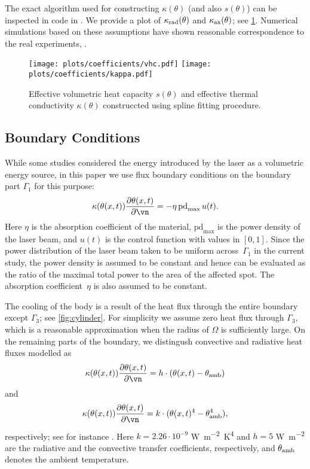 The exact algorithm used for constructing $\kappa(\theta)$ (and also $s(\theta)$) can be inspected in code in \cite[\texttt{optipuls.coefficients}]{optipuls_github}. 
We provide a plot of $\kappa_\textup{rad}(\theta)$ and $\kappa_\textup{ax}(\theta)$; see \cref{fig:coef}.
Numerical simulations based on these assumptions have shown reasonable correspondence to the real experiments, .

\begin{figure}[ht]
	\centering
	\texttt{[image: plots/coefficients/vhc.pdf]}
	\texttt{[image: plots/coefficients/kappa.pdf]}
	\caption{Effective volumetric heat capacity $s(\theta)$ and effective thermal conductivity $\kappa(\theta)$ construccted using spline fitting procedure.}
	\label{fig:coef}
\end{figure}


\subsection{Boundary Conditions}
\label{subsec:boundary_conditions}

While some studies considered the energy introduced by the laser as a volumetric energy source, in this paper we use flux boundary conditions on the boundary part $\Gamma_1$ for this purpose:
\begin{equation}
	\kappa(\theta(x,t)) \frac{\partial \theta(x,t)}{\partial \vn} 
	= 
	- \eta \, \text{pd}_{\max} \, u(t)
	.
\end{equation}
Here $\eta$ is the absorption coefficient of the material, $\text{pd}_{\max}$ is the power density of the laser beam, and $u(t)$ is the control function with values in $[0,1]$.
Since the power distribution of the laser beam taken to be uniform across~$\Gamma_1$ in the current study, the power density is assumed to be constant and hence can be evaluated as the ratio of the maximal total power to the area of the affected spot. 
The absorption coefficient~$\eta$ is also assumed to be constant.

The cooling of the body is a result of the heat flux through the entire boundary except $\Gamma_3$; see \cref{fig:cylinder}.
For simplicity we assume zero heat flux through $\Gamma_3$, which is a reasonable approximation when the radius of $\Omega$ is sufficiently large.
On the remaining parts of the boundary, we distingush convective and radiative heat fluxes modelled as
\begin{equation}
	\kappa(\theta(x,t)) \frac{\partial \theta(x,t)}{\partial \vn} 
	= 
	h \cdot (\theta(x,t) - \theta_\textup{amb})
\end{equation}
and
\begin{equation}
	\kappa(\theta(x,t)) \frac{\partial \theta(x,t)}{\partial \vn} 
	= 
	k \cdot (\theta(x,t)^4 - \theta^4_\textup{amb})
	,
\end{equation}
respectively; see for instance \cite[Chapter~3]{Sluzalec:2005:1}.
Here $k = 2.26 \cdot 10^{-9}$ \si{\W\per\m^2\K^4} and $h = 5$ \si{\W\per\m^2} are the radiative and the convective transfer coefficients, respectively, and $\theta_\textup{amb}$ denotes the ambient temperature.


